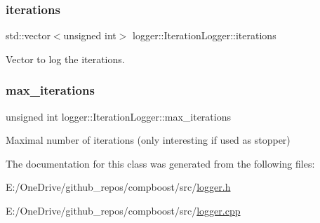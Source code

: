 \subsubsection{\texorpdfstring{iterations}{iterations}}
{\footnotesize\ttfamily std\+::vector$<$unsigned int$>$ logger\+::\+Iteration\+Logger\+::iterations\hspace{0.3cm}{\ttfamily [private]}}



Vector to log the iterations. 

\mbox{\label{classlogger_1_1_iteration_logger_a3fe389ce81d0790729b59b96414a3909}} 
\subsubsection{\texorpdfstring{max\+\_\+iterations}{max\_iterations}}
{\footnotesize\ttfamily unsigned int logger\+::\+Iteration\+Logger\+::max\+\_\+iterations\hspace{0.3cm}{\ttfamily [private]}}



Maximal number of iterations (only interesting if used as stopper) 



The documentation for this class was generated from the following files\+:\begin{DoxyCompactItemize}
\item 
E\+:/\+One\+Drive/github\+\_\+repos/compboost/src/\mbox{\hyperlink{logger_8h}{logger.\+h}}\item 
E\+:/\+One\+Drive/github\+\_\+repos/compboost/src/\mbox{\hyperlink{logger_8cpp}{logger.\+cpp}}\end{DoxyCompactItemize}

